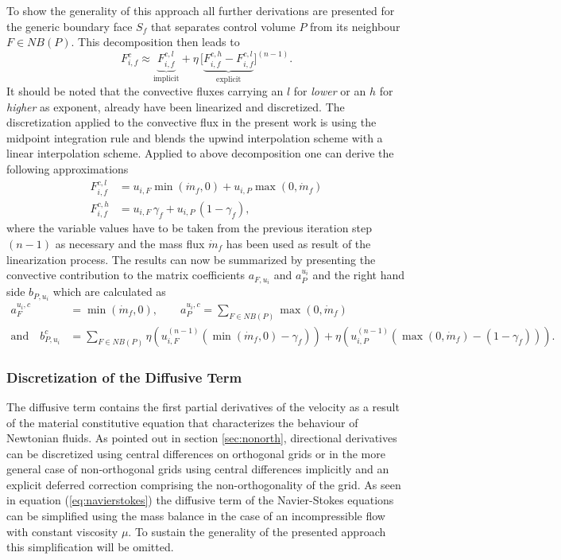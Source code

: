 To show the generality of this approach all further derivations are presented for the generic boundary face \(S_f\) that separates control volume \(P\) from its neighbour \(F \in NB(P)\). This decomposition then leads to
\begin{displaymath}
  F_{i,f}^c \approx  \underbrace{F_{i,f}^{c,l}}_{\text{implicit}} + \eta \, \bigl[\underbrace{ F_{i,f}^{c,h} - F_{i,f}^{c,l} }_{\text{explicit}}\bigr]^{(n-1)}.
\end{displaymath}
It should be noted that the convective fluxes carrying an \(l\) for \emph{lower} or an \(h\) for \emph{higher} as exponent, already have been linearized and discretized. The discretization applied to the convective flux in the present work is using the midpoint integration rule and blends the upwind interpolation scheme with a linear interpolation scheme. Applied to above decomposition one can derive the following approximations
\begin{align*}
  F_{i,f}^{c,l} &= u_{i,F} \min(\dot{m}_f ,0) + u_{i,P} \max(0,\dot{m}_f) \\
  F_{i,f}^{c,h} &= u_{i,F} \, \gamma_f + u_{i,P} \, (1 - \gamma_f),
\end{align*}
where the variable values have to be taken from the previous iteration step \((n-1)\) as necessary and the mass flux \(\dot{m}_f\) has been used as result of the linearization process. The results can now be summarized by presenting the convective contribution to the matrix coefficients \(a_{F,u_i}\) and \(a_P^{u_i}\) and the right hand side \(b_{P,u_i}\) which are calculated as
\begin{subequations}
\begin{align}
  a_F^{u_i,c} &= \min(\dot{m}_f ,0), \quad \quad a_P^{u_i,c} = \sum_{F \in NB(P)} \max(0,\dot{m}_f) \\[1em]
  \text{and} \quad b_{P,u_i}^c &= \sum_{F \in NB(P)} \eta  \left(u_{i,F}^{(n-1)} \left( \min(\dot{m}_f,0) - \gamma_f \right)\right)
                   + \eta \left( u_{i,P}^{(n-1)} \left( \max(0,\dot{m}_f) - \left(1 - \gamma_f\right) \right)\right).
\end{align}
\end{subequations}

\subsubsection{Discretization of the Diffusive Term}

The diffusive term contains the first partial derivatives of the velocity as a result of the material constitutive equation that characterizes the behaviour of Newtonian fluids. As pointed out in section \ref{sec:nonorth}, directional derivatives can be discretized using central differences on orthogonal grids or in the more general case of non-orthogonal grids using central differences implicitly and an explicit deferred correction comprising the non-orthogonality of the grid. As seen in equation (\ref{eq:navierstokes}) the diffusive term of the Navier-Stokes equations can be simplified using the mass balance in the case of an incompressible flow with constant viscosity \(\mu\). To sustain the generality of the presented approach this simplification will be omitted.

